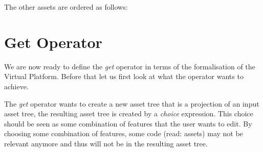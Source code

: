 The other assets are ordered as follows:
\begin{center}
\end{center}

\section{Get Operator}\label{sec:vp:getoperator}
We are now ready to define the \emph{get} operator in terms of the
formalisation of the Virtual Platform. Before that let us first look at what
the operator wants to achieve.

The \emph{get} operator wants to create a new asset tree that is a projection
of an input asset tree, the resulting asset tree is created by a \emph{choice}
expression. This choice should be seen as some combination of features that
the user wants to edit. By choosing some combination of features, some code
(read: assets) may not be relevant anymore and thus will not be in the
resulting asset tree. 

